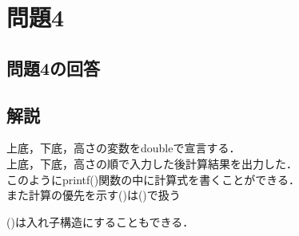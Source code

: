 \documentclass[a4j,titlepage,dvipdfmx]{jsarticle}   %
\newcommand{\codepath}{./code}
\begin{document}
\section{問題4}
\subsection{問題4の回答}

\subsection{解説}
上底，下底，高さの変数をdoubleで宣言する．\\
上底，下底，高さの順で入力した後計算結果を出力した．\\

このようにprintf()関数の中に計算式を書くことができる．\\
また計算の優先を示す()は()で扱う

()は入れ子構造にすることもできる．\\
\end{document}
